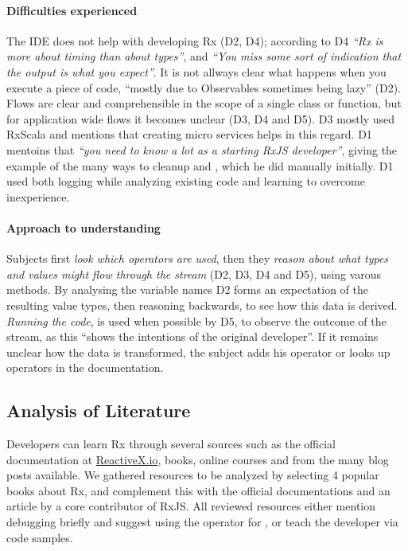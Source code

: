\paragraph{Difficulties experienced} The IDE does not help with
developing Rx (D2, D4); according to D4 \emph{``Rx is more about timing
than about types''}, and \emph{``You miss some sort of indication that
the output is what you expect''}.  It is not allways clear what happens
when you execute a piece of code, ``mostly due to Observables sometimes
being lazy'' (D2).  Flows are clear and comprehensible in the scope of a
single class or function, but for application wide flows it becomes
unclear (D3, D4 and D5).  D3 mostly used RxScala and mentions that
creating micro services helps in this regard.  D1 mentoins that \emph{``you
need to know a lot as a starting {\lbrack}RxJS{\rbrack} developer''},
giving the example of the many ways to cleanup and ,
which he did manually initially.  D1 used both logging while analyzing
existing code and learning to overcome inexperience.

\paragraph{Approach to understanding} Subjects first \emph{look which
operators are used}, then they \emph{reason about what types and values
might flow through the stream} (D2, D3, D4 and D5), using varous
methods.  By analysing the variable names D2 forms an expectation of the
resulting value types, then reasoning backwards, to see how this data is
derived.  \emph{Running the code}, is used when possible by D5, to
observe the outcome of the stream, as this ``shows the intentions of the
original developer''.  If it remains unclear how the data is
transformed, the subject adds his  operator or looks up
operators in the documentation.

\subsection{Analysis of Literature} Developers can learn Rx through
several sources such as the official documentation at \href{http://reactivex.io}
{ReactiveX.io}, books, online courses and from the many blog posts
available.  We gathered resources to be analyzed by selecting 4 popular
books about Rx, and complement this with the official documentations and
an article by a core contributor of RxJS.  All reviewed resources either
mention debugging briefly and suggest using the  operator for
\printfdebugging{}, or teach the developer \printfdebugging{} via code
samples.

